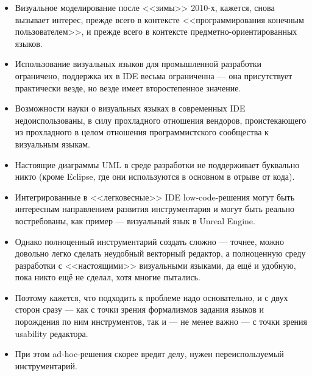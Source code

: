 \documentclass{text-style}
\begin{document}
\begin{itemize}
    \item Визуальное моделирование после <<зимы>> 2010-х, кажется, снова вызывает интерес, прежде всего в контексте <<программирования конечным пользователем>>, и прежде всего в контексте предметно-ориентированных языков.
    \item Использование визуальных языков для промышленной разработки ограничено, поддержка их в IDE весьма ограниченна --- она присутствует практически везде, но везде имеет второстепенное значение.
    \item Возможности науки о визуальных языках в современных IDE недоиспользованы, в силу прохладного отношения вендоров, проистекающего из прохладного в целом отношения программистского сообщества к визуальным языкам.
    \item Настоящие диаграммы UML в среде разработки не поддерживает буквально никто (кроме Eclipse, где они используются в основном в отрыве от кода).
    \item Интегрированные в <<легковесные>> IDE low-code-решения могут быть интересным направлением развития инструментария и могут быть реально востребованы, как пример --- визуальный язык в Unreal Engine.
    \item Однако полноценный инструментарий создать сложно --- точнее, можно довольно легко сделать неудобный векторный редактор, а полноценную среду разработки с <<настоящими>> визуальными языками, да ещё и удобную, пока никто ещё не сделал, хотя многие пытались.
    \item Поэтому кажется, что подходить к проблеме надо основательно, и с двух сторон сразу --- как с точки зрения формализмов задания языков и порождения по ним инструментов, так и --- не менее важно --- с точки зрения usability редактора.
    \item При этом ad-hoc-решения скорее вредят делу, нужен переиспользуемый инструментарий.
\end{itemize}
\end{document}
